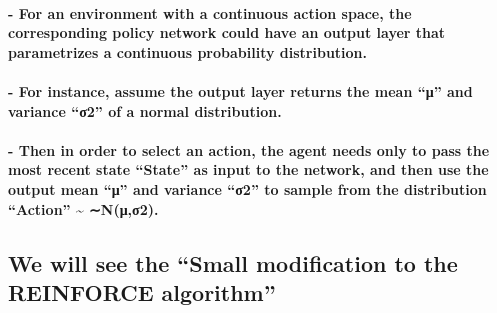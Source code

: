 \documentclass[11pt]{article}
\begin{document}
\hypertarget{for-an-environment-with-a-continuous-action-space-the-corresponding-policy-network-could-have-an-output-layer-that-parametrizes-a-continuous-probability-distribution.}{%
\paragraph{- For an environment with a continuous action space, the
corresponding policy network could have an output layer that
parametrizes a continuous probability
distribution.}\label{for-an-environment-with-a-continuous-action-space-the-corresponding-policy-network-could-have-an-output-layer-that-parametrizes-a-continuous-probability-distribution.}}

\hypertarget{for-instance-assume-the-output-layer-returns-the-mean-ux3bc-and-variance-ux3c32-of-a-normal-distribution.}{%
\paragraph{- For instance, assume the output layer returns the mean
``μ'' and variance ``σ2'' of a normal
distribution.}\label{for-instance-assume-the-output-layer-returns-the-mean-ux3bc-and-variance-ux3c32-of-a-normal-distribution.}}

\hypertarget{then-in-order-to-select-an-action-the-agent-needs-only-to-pass-the-most-recent-state-state-as-input-to-the-network-and-then-use-the-output-mean-ux3bc-and-variance-ux3c32-to-sample-from-the-distribution-action-nux3bcux3c32.}{%
\paragraph{- Then in order to select an action, the agent needs only to
pass the most recent state ``State'' as input to the network, and then
use the output mean ``μ'' and variance ``σ2'' to sample from the
distribution ``Action'' \textasciitilde{}
∼N(μ,σ2).}\label{then-in-order-to-select-an-action-the-agent-needs-only-to-pass-the-most-recent-state-state-as-input-to-the-network-and-then-use-the-output-mean-ux3bc-and-variance-ux3c32-to-sample-from-the-distribution-action-nux3bcux3c32.}}

\hypertarget{we-will-see-the-small-modification-to-the-reinforce-algorithm}{%
\subsection{We will see the ``Small modification to the REINFORCE
algorithm''}\label{we-will-see-the-small-modification-to-the-reinforce-algorithm}}
\end{document}
